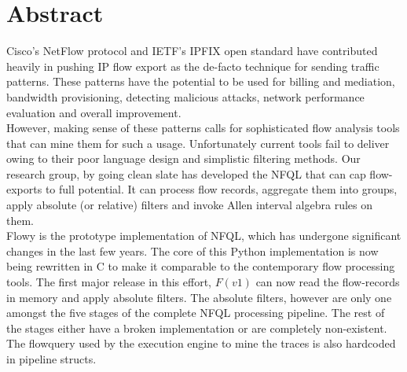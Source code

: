 \begingroup
\let\clearpage\relax
\let\cleardoublepage\relax
\let\cleardoublepage\relax
\chapter*{Abstract}

Cisco's NetFlow protocol \cite{rfc3954} and \ac{IETF}'s \ac{IPFIX}
\cite{rfc5101} open standard have contributed heavily in pushing \ac{IP} flow
export as the de-facto technique for sending traffic patterns. These patterns
have the potential to be used for billing and mediation, bandwidth
provisioning, detecting malicious attacks, network performance evaluation and
overall improvement. \\

However, making sense of these patterns calls for sophisticated flow analysis
tools that can mine them for such a usage. Unfortunately current tools fail to
deliver owing to their poor language design and simplistic filtering methods.
Our research group, by going clean slate has developed the \ac{NFQL}
\cite{vmarinov:thesis:2009} that can cap flow-exports to full potential. It can
process flow records, aggregate them into groups, apply absolute (or relative)
filters and invoke Allen interval algebra rules \cite{fallen:1983} on them. \\

Flowy \cite{kkanev:thesis:2009} is the prototype implementation of \ac{NFQL},
which has undergone significant changes in the last few years.  The core of
this Python implementation is now being rewritten in C to make it comparable
to the contemporary flow processing tools. The first major release in this
effort, $F(v1)$ \cite{jschauer:thesis:2011} can now read the flow-records in
memory and apply absolute filters. The absolute filters, however are only one
amongst the five stages of the complete \ac{NFQL} processing pipeline. The
rest of the stages either have a broken implementation or are completely
non-existent. The flowquery used by the execution engine to mine the traces
is also hardcoded in pipeline structs. \\

